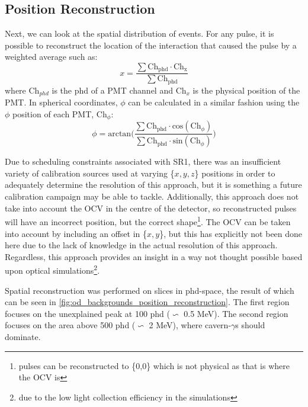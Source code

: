 



\subsection{Position Reconstruction}
\par
Next, we can look at the spatial distribution of events.
For any pulse, it is possible to reconstruct the location of the interaction that caused the pulse by a weighted average such as:
\begin{equation}
    x = \frac{\sum{\text{Ch}_{\text{phd}} \cdot \text{Ch}_\text{x}}}{\sum{\text{Ch}_\text{phd}}} 
\label{eq:OD_xy_position}
\end{equation}
where Ch$_{phd}$ is the phd of a PMT channel and Ch$_{x}$ is the physical position of the PMT.
In spherical coordinates, $\phi$ can be calculated in a similar fashion using the $\phi$ position of each PMT, Ch$_\phi$:
\begin{equation}
    \phi = \text{arctan}\bigg( \frac{\sum{\text{Ch}_\text{phd} \cdot \text{cos}(\text{Ch}_{\phi})}}{\sum{\text{Ch}_\text{phd} \cdot \text{sin}(\text{Ch}_{\phi})}} \bigg)
\label{eq:OD_phi_position}
\end{equation}
\par
Due to scheduling constraints associated with SR1, there was an insufficient variety of calibration sources used at varying \{$x,y,z$\} positions in order to adequately determine the resolution of this approach, but it is something a future calibration campaign may be able to tackle. 
Additionally, this approach does not take into account the OCV in the centre of the detector, so reconstructed pulses will have an incorrect position, but the correct shape\footnote{pulses can be reconstructed to \{0,0\} which is not physical as that is where the OCV is}.
The OCV can be taken into account by including an offset in \{$x,y$\}, but this has explicitly not been done here due to the lack of knowledge in the actual resolution of this approach.
Regardless, this approach provides an insight in a way not thought possible based upon optical simulations\footnote{due to the low light collection efficiency in the simulations}.

\par
Spatial reconstruction was performed on slices in phd-space, the result of which can be seen in \autoref{fig:od_backgrounds_position_reconstruction}.
The first region focuses on the unexplained peak at 100 phd ($\backsim$ 0.5 MeV).
The second region focuses on the area above 500 phd ($\backsim$ 2 MeV), where cavern-$\gamma$s should dominate.

